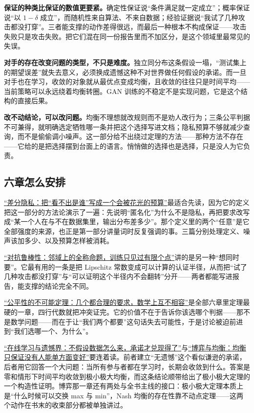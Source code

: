 \textbf{保证的种类比保证的数值更要紧。}确定性保证说``条件满足就一定成立''；概率保证说``以 \(1-\delta\) 成立''，而随机性来自算法、不来自数据；经验证据说``我试了几种攻击都没打穿''。三者能支撑的动作差得很远，而最后一种根本不构成保证——攻击失败只是攻击失败。把它们混在同一份报告里而不加区分，是这个领域里最常见的失误。

\textbf{对手的存在改变问题的类型，不只是难度。}独立同分布这条假设一塌，``测试集上的期望误差''就失去意义，必须换成遗憾这种不对世界做任何假设的承诺。而一旦对手也在学习，收敛的对象就从最优点变成均衡，且收敛的往往只是时间平均——当前策略可以永远绕着均衡转圈。GAN 训练的不稳定不是实现问题，它是这个结构的直接后果。

\textbf{改不动结论，可以改问题。}均衡不理想就改规则而不是劝人改行为；三条公平判据不可兼得，就明确选定牺牲哪一条并把这个选择写进文档；隐私预算不够就减少查询，而不是偷偷调小噪声。这一部分给不出绕过定理的方法——那种方法不存在——它给的是把选择摆到台面上的语言。悄悄做的选择也是选择，只是没人为它负责。

\subsection{六章怎么安排}

\hyperref[ch:141]{``差分隐私：把``看不出是谁''写成一个会被花光的预算''}最适合先读，因为它的定义把这一部分的方法论演示了一遍：先说明``匿名化''为什么不是隐私，再把要求改写成``某一个人在与不在数据集里，输出分布差多少''。那个定义里的两个``任意''是它全部强度的来源，也正是第一部分讲量词时反复强调的事。三篇分别处理定义、噪声该加多少、以及预算怎样被消耗。

\hyperref[ch:142]{``对抗鲁棒性：邻域上的全称命题，训练只见过有限个点''}讲的是另一种``想同时要''。它最有用的一条是把 Lipschitz 常数变成可以计算的认证半径，从而把``试了几种攻击都没打穿''与``可以证明这个半径内不会翻转''分开——两者都能写进报告，能支撑的结论完全不同。

\hyperref[ch:143]{``公平性的不可能定理：几个都合理的要求，数学上互不相容''}是全部六章里定理最硬的一章，四行代数就把冲突证完。它的价值不在于告诉你该选哪个判据——那不是数学问题——而在于让``我们两个都要''这句话失去可能性，于是讨论被迫前进到``我们选哪一个、为什么''。

\hyperref[ch:144]{``在线学习与遗憾界：不假设数据怎么来，承诺才兑现得了''}与\hyperref[ch:146]{``博弈与均衡：均衡只保证没有人能单方面变好''}要连着读。前者建立``无遗憾''这个看似谦逊的承诺，后者用它回答一个大问题：当所有参与者都在学习时，长期会收敛到什么。答案是零和情形下时间平均收敛到极小极大均衡，而这条结论顺带给出了极小极大定理的一个构造性证明。博弈那一章还有两处与全书主线的接口：极小极大定理本质上是``什么时候可以交换 max 与 min''，Nash 均衡的存在性靠不动点定理——这两个动作在书末的收束部分都被单独讲过。

